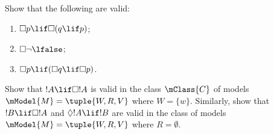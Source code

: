 \documentclass[../../../include/open-logic-section]{subfiles}
\begin{document}
\begin{prob}
  Show that the following are valid:
  \begin{enumerate}
  \item $\Box p \lif \Box (q \lif p)$;
  \item $\Box \lnot \lfalse$;
  \item $\Box p \lif (\Box q \lif \Box p)$.
  \end{enumerate}
\end{prob}

\begin{prob}
  Show that $!A \lif \Box!A$ is valid in the class $\mClass{C}$ of
  models $\mModel{M} = \tuple{W, R, V}$ where $W = \{w\}$. Similarly,
  show that $!B \lif \Box !A$ and $\Diamond !A \lif !B$ are valid in
  the class of models $\mModel{M} = \tuple{W, R, V}$ where
  $R = \emptyset$.
\end{prob}
\end{document}

